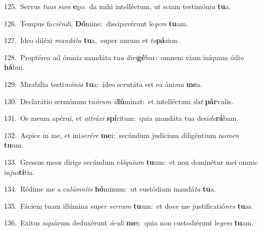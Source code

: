 {\numbfont\textcolor{\numbcolor}{125.}}~Servus \textit{tu}\-\textit{us} \textit{sum} \textbf{e}\-go:~\star da mihi intelléctum, ut sciam testimóni\textit{a} \textbf{tu}\-a.\par
{\numbfont\textcolor{\numbcolor}{126.}}~Tempus fa\-\textit{ci}\-\textit{én}\textit{di}, \textbf{Dó}\-mine:~\star dissipavérunt le\textit{gem} \textbf{tu}\-am.\par
{\numbfont\textcolor{\numbcolor}{127.}}~Ideo diléxi \textit{man}\-\textit{dá}\textit{ta} \textbf{tu}\-a,~\star super aurum et \textit{to}\-\textbf{pá}zion.\par
{\numbfont\textcolor{\numbcolor}{128.}}~Proptérea ad ómnia mandáta tu\textit{a} \textit{di}\-\textit{ri}\textbf{gé}bar:~\star omnem viam iníquam ódi\textit{o} \textbf{há}\-bui.\par
{\numbfont\textcolor{\numbcolor}{129.}}~Mirabília testi\-\textit{mó}\-\textit{ni}\textit{a} \textbf{tu}\-a:~\star ídeo scrutáta est ea áni\textit{ma} \textbf{me}\-a.\par
{\numbfont\textcolor{\numbcolor}{130.}}~Declarátio sermónum tu\-\textit{ó}\-\textit{rum} \textit{il}\-\textbf{lú}minat:~\star et intelléctum \textit{dat} \textbf{pár}\-vulis.\par
{\numbfont\textcolor{\numbcolor}{131.}}~Os meum apérui, et \textit{at}\-\textit{trá}\textit{xi} \textbf{spí}\-ritum:~\star quia mandáta tua desi\-\textit{de}\-\textbf{rá}bam.\par
{\numbfont\textcolor{\numbcolor}{132.}}~Aspice in me, et mi\-\textit{se}\-\textit{ré}\textit{re} \textbf{me}\-i:~\star secúndum judícium diligéntium no\textit{men} \textbf{tu}\-um.\par
{\numbfont\textcolor{\numbcolor}{133.}}~Gressus meos dírige secúndum e\-\textit{ló}\-\textit{qui}\textit{um} \textbf{tu}\-um:~\star et non dominétur mei omnis in\-\textit{jus}\-\textbf{tí}tia.\par
{\numbfont\textcolor{\numbcolor}{134.}}~Rédime me a ca\-\textit{lúm}\-\textit{ni}\textit{is} \textbf{hó}\-minum:~\star ut custódiam mandá\textit{ta} \textbf{tu}\-a.\par
{\numbfont\textcolor{\numbcolor}{135.}}~Fáciem tuam illúmina su\textit{per} \textit{ser}\-\textit{vum} \textbf{tu}\-um:~\star et doce me justificatió\textit{nes} \textbf{tu}\-as.\par
{\numbfont\textcolor{\numbcolor}{136.}}~Exitus aquárum deduxérunt \textit{ó}\-\textit{cu}\textit{li} \textbf{me}\-i:~\star quia non custodiérunt le\textit{gem} \textbf{tu}\-am.\par
